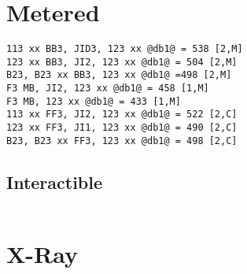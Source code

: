 \documentclass[main.tex]{subfiles}
\begin{document}
\section{Metered}


\begin{lstlisting}[language=FG]
113 xx BB3, JID3, 123 xx @db1@ = 538 [2,M]
123 xx BB3, JI2, 123 xx @db1@ = 504 [2,M]
B23, B23 xx BB3, 123 xx @db1@ =498 [2,M]
F3 MB, JI2, 123 xx @db1@ = 458 [1,M]
F3 MB, 123 xx @db1@ = 433 [1,M]
113 xx FF3, JI2, 123 xx @db1@ = 522 [2,C]
123 xx FF3, JI1, 123 xx @db1@ = 490 [2,C]
B23, B23 xx FF3, 123 xx @db1@ = 498 [2,C]
\end{lstlisting}

\subsection{Interactible}
\begin{lstlisting}[language=FG]

\end{lstlisting}

\section{X-Ray}
\begin{lstlisting}[language=FG]

\end{lstlisting}
\end{document}

